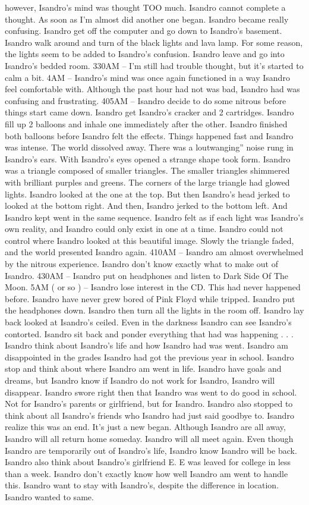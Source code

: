 \documentclass[12pt]{book}
\begin{document}
however, Isandro's mind was thought TOO much. Isandro cannot complete a thought. As soon as I'm almost did another one began. Isandro became really confusing. Isandro get off the computer and go down to Isandro's basement. Isandro walk around and turn of the black lights and lava lamp. For some reason, the lights seem to be added to Isandro's confusion. Isandro leave and go into Isandro's bedded room. 330AM -- I'm still had trouble thought, but it's started to calm a bit. 4AM -- Isandro's mind was once again functioned in a way Isandro feel comfortable with. Although the past hour had not was bad, Isandro had was confusing and frustrating. 405AM -- Isandro decide to do some nitrous before things start came down. Isandro get Isandro's cracker and 2 cartridges. Isandro fill up 2 balloons and inhale one immediately after the other. Isandro finished both balloons before Isandro felt the effects. Things happened fast and Isandro was intense. The world dissolved away. There was a loutwanging'' noise rung in Isandro's ears. With Isandro's eyes opened a strange shape took form. Isandro was a triangle composed of smaller triangles. The smaller triangles shimmered with brilliant purples and greens. The corners of the large triangle had glowed lights. Isandro looked at the one at the top. But then Isandro's head jerked to looked at the bottom right. And then, Isandro jerked to the bottom left. And Isandro kept went in the same sequence. Isandro felt as if each light was Isandro's own reality, and Isandro could only exist in one at a time. Isandro could not control where Isandro looked at this beautiful image. Slowly the triangle faded, and the world presented Isandro again. 410AM -- Isandro am almost overwhelmed by the nitrous experience. Isandro don't know exactly what to make out of Isandro. 430AM -- Isandro put on headphones and listen to Dark Side Of The Moon. 5AM ( or so ) -- Isandro lose interest in the CD. This had never happened before. Isandro have never grew bored of Pink Floyd while tripped. Isandro put the headphones down. Isandro then turn all the lights in the room off. Isandro lay back looked at Isandro's ceiled. Even in the darkness Isandro can see Isandro's contorted. Isandro sit back and ponder everything that had was happening . . .  Isandro think about Isandro's life and how Isandro had was went. Isandro am disappointed in the grades Isandro had got the previous year in school. Isandro stop and think about where Isandro am went in life. Isandro have goals and dreams, but Isandro know if Isandro do not work for Isandro, Isandro will disappear. Isandro swore right then that Isandro was went to do good in school. Not for Isandro's parents or girlfriend, but for Isandro. Isandro also stopped to think about all Isandro's friends who Isandro had just said goodbye to. Isandro realize this was an end. It's just a new began. Although Isandro are all away, Isandro will all return home someday. Isandro will all meet again. Even though Isandro are temporarily out of Isandro's life, Isandro know Isandro will be back. Isandro also think about Isandro's girlfriend E. E was leaved for college in less than a week. Isandro don't exactly know how well Isandro am went to handle this. Isandro want to stay with Isandro's, despite the difference in location. Isandro wanted to same. 
\end{document}
